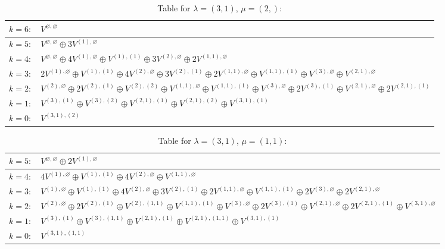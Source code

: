 \documentclass[a4paper,12pt]{article}
\begin{document}
\renewcommand{\arraystretch}{1.6} 
\begin{table}[H]
\centering
\caption{Table for $\lambda = (3, 1)$, $\mu = (2,)$:}
\begin{tabular}{|>{\centering\arraybackslash}p{15cm}|}
\hline
 $k = 6: \quad V^{\varnothing, \varnothing} $ \\ \hline
 $k = 5: \quad V^{\varnothing, \varnothing} \oplus 3 V^{(1), \varnothing} $ \\ \hline
 $k = 4: \quad V^{\varnothing, \varnothing} \oplus 4 V^{(1), \varnothing} \oplus V^{(1), (1)} \oplus 3 V^{(2), \varnothing} \oplus 2 V^{(1, 1), \varnothing} $ \\ \hline
 $k = 3: \quad 2 V^{(1), \varnothing} \oplus V^{(1), (1)} \oplus 4 V^{(2), \varnothing} \oplus 3 V^{(2), (1)} \oplus 2 V^{(1, 1), \varnothing} \oplus V^{(1, 1), (1)} \oplus V^{(3), \varnothing} \oplus V^{(2, 1), \varnothing} $ \\ \hline
 $k = 2: \quad V^{(2), \varnothing} \oplus 2 V^{(2), (1)} \oplus V^{(2), (2)} \oplus V^{(1, 1), \varnothing} \oplus V^{(1, 1), (1)} \oplus V^{(3), \varnothing} \oplus 2 V^{(3), (1)} \oplus V^{(2, 1), \varnothing} \oplus 2 V^{(2, 1), (1)} $ \\ \hline
 $k = 1: \quad V^{(3), (1)} \oplus V^{(3), (2)} \oplus V^{(2, 1), (1)} \oplus V^{(2, 1), (2)} \oplus V^{(3, 1), (1)} $ \\ \hline
 $k = 0: \quad V^{(3, 1), (2)} $ \\ \hline
\end{tabular}
\end{table}

\renewcommand{\arraystretch}{1.6} 
\begin{table}[H]
\centering
\caption{Table for $\lambda = (3, 1)$, $\mu = (1, 1)$:}
\begin{tabular}{|>{\centering\arraybackslash}p{15cm}|}
\hline
 $k = 5: \quad V^{\varnothing, \varnothing} \oplus 2 V^{(1), \varnothing} $ \\ \hline
 $k = 4: \quad 4 V^{(1), \varnothing} \oplus V^{(1), (1)} \oplus 4 V^{(2), \varnothing} \oplus V^{(1, 1), \varnothing} $ \\ \hline
 $k = 3: \quad V^{(1), \varnothing} \oplus V^{(1), (1)} \oplus 4 V^{(2), \varnothing} \oplus 3 V^{(2), (1)} \oplus 2 V^{(1, 1), \varnothing} \oplus V^{(1, 1), (1)} \oplus 2 V^{(3), \varnothing} \oplus 2 V^{(2, 1), \varnothing} $ \\ \hline
 $k = 2: \quad V^{(2), \varnothing} \oplus 2 V^{(2), (1)} \oplus V^{(2), (1, 1)} \oplus V^{(1, 1), (1)} \oplus V^{(3), \varnothing} \oplus 2 V^{(3), (1)} \oplus V^{(2, 1), \varnothing} \oplus 2 V^{(2, 1), (1)} \oplus V^{(3, 1), \varnothing} $ \\ \hline
 $k = 1: \quad V^{(3), (1)} \oplus V^{(3), (1, 1)} \oplus V^{(2, 1), (1)} \oplus V^{(2, 1), (1, 1)} \oplus V^{(3, 1), (1)} $ \\ \hline
 $k = 0: \quad V^{(3, 1), (1, 1)} $ \\ \hline
\end{tabular}
\end{table}
\end{document}

